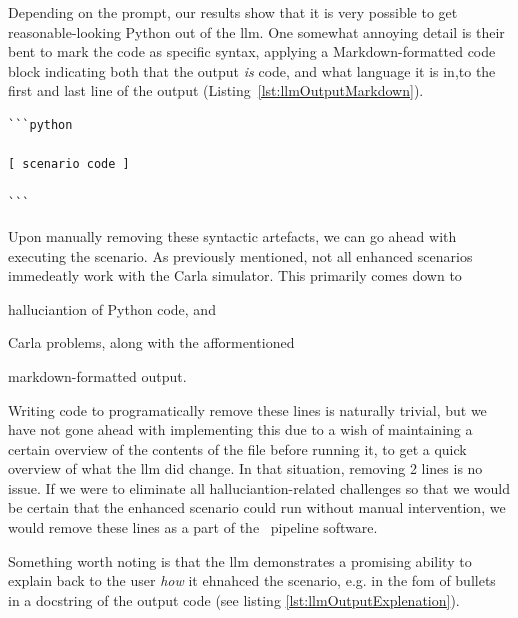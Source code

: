Depending on the prompt, our results show that it is very possible to get
reasonable-looking Python out of the \acrshort{llm}. One somewhat annoying
detail is their bent to mark the code as specific syntax, applying a Markdown-formatted code block
indicating both that the output \emph{is} code, and what language it is in,to the first and last
line of the output (Listing~\ref{lst:llmOutputMarkdown}).
\begin{lstlisting}[caption={LLM-generated Python code with Markdown syntax. The bracketed part on line 3 has been added for demonstration purposes, removing the actual code for brevity.}, label={lst:llmOutputMarkdown}]
```python

[ scenario code ]

```
\end{lstlisting}

Upon manually removing these syntactic artefacts, we can go ahead with executing
the scenario. As previously mentioned, not all enhanced scenarios immedeatly work with the Carla
simulator. This primarily comes down to \begin{inparaenum}
    \item halluciantion of Python code, and
    \item Carla problems, along with the afformentioned
    \item markdown-formatted output.
\end{inparaenum}

Writing code to programatically remove these lines is naturally trivial, but we have
not gone ahead with implementing this due to a wish of maintaining a certain overview of the
contents of the file before running it, to get a quick overview of what the \acrshort{llm} did
change. In that situation, removing \num{2} lines is no issue. If we were to eliminate all
halluciantion-related challenges so that we would be certain that the enhanced scenario could run
without manual intervention, we would remove these lines as a part of the \hefe~pipeline software.

Something worth noting is that the \acrshort{llm} demonstrates a promising
ability to explain back to the user \emph{how} it ehnahced the scenario, e.g. in
the fom of bullets in a docstring of the output code (see listing \ref{lst:llmOutputExplenation}).

